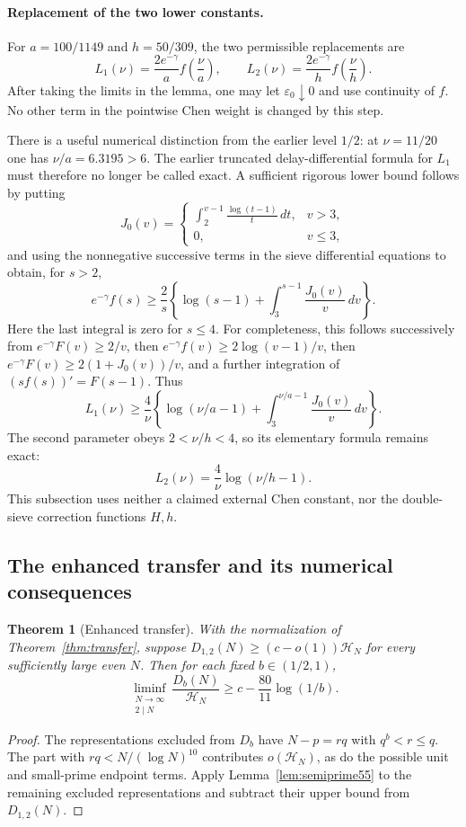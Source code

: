 \documentclass[11pt]{article}
\newtheorem{theorem}{Theorem}
\newcommand{\HN}{\mathcal H_N}
\begin{document}
\paragraph{Replacement of the two lower constants.}
For $a=100/1149$ and $h=50/309$, the two permissible replacements are
\[
 L_1(\nu)=\frac{2e^{-\gamma}}a f\left(\frac\nu a\right),
 \qquad
 L_2(\nu)=\frac{2e^{-\gamma}}h f\left(\frac\nu h\right).
\]
After taking the limits in the lemma, one may let
$\varepsilon_0\downarrow0$ and use continuity of $f$.
No other term in the pointwise Chen weight is changed by this step.

There is a useful numerical distinction from the earlier level
$1/2$: at $\nu=11/20$ one has $\nu/a=6.3195>6$.
The earlier truncated delay-differential formula for $L_1$ must
therefore no longer be called exact. A sufficient rigorous lower
bound follows by putting
\[
 J_0(v)=\begin{cases}
 \displaystyle\int_2^{v-1}\frac{\log(t-1)}t\,dt,&v>3,\\
 0,&v\le3,
 \end{cases}
\]
and using the nonnegative successive terms in the sieve differential
equations to obtain, for $s>2$,
\[
 e^{-\gamma}f(s)\ge\frac2s
 \left\{\log(s-1)+\int_3^{s-1}\frac{J_0(v)}v\,dv\right\}.
\]
Here the last integral is zero for $s\le4$.
For completeness, this follows successively from
$e^{-\gamma}F(v)\ge2/v$, then
$e^{-\gamma}f(v)\ge2\log(v-1)/v$, then
$e^{-\gamma}F(v)\ge2(1+J_0(v))/v$, and a further integration
of $(sf(s))'=F(s-1)$. Thus
\[
 L_1(\nu)\ge\frac4\nu
 \left\{\log(\nu/a-1)
       +\int_3^{\nu/a-1}\frac{J_0(v)}v\,dv\right\}.
\]
The second parameter obeys $2<\nu/h<4$, so its elementary formula
remains exact:
\[
 L_2(\nu)=\frac4\nu\log(\nu/h-1).
\]
This subsection uses neither a claimed external Chen constant,
nor the double-sieve correction functions $H,h$.

\subsection{The enhanced transfer and its numerical consequences}
\label{sec:enhanced-corollaries}

\begin{theorem}[Enhanced transfer]\label{thm:enhanced-transfer}
With the normalization of Theorem~\ref{thm:transfer}, suppose
$D_{1,2}(N)\ge(c-o(1))\HN$ for every sufficiently large even $N$.
Then for each fixed $b\in(1/2,1)$,
\[
 \liminf_{\substack{N\to\infty\\2\mid N}}
 \frac{D_b(N)}{\HN}
 \ge c-\frac{80}{11}\log(1/b).
\]
\end{theorem}
\begin{proof}
The representations excluded from $D_b$ have
$N-p=rq$ with $q^b<r\le q$. The part with
$rq<N/(\log N)^{10}$ contributes $o(\HN)$, as do the possible
unit and small-prime endpoint terms. Apply
Lemma~\ref{lem:semiprime55} to the remaining excluded representations
and subtract their upper bound from $D_{1,2}(N)$.
\end{proof}
\end{document}
